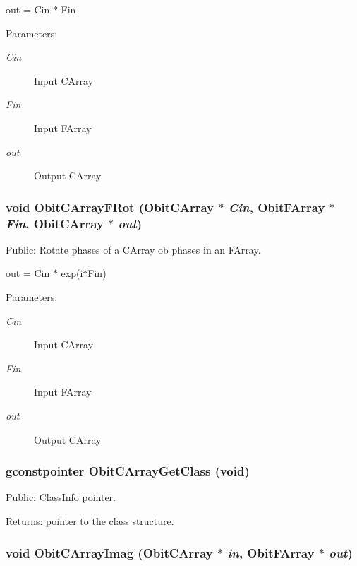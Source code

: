 out = Cin $\ast$ Fin \begin{Desc}
\item[Parameters:]
\begin{description}
\item[{\em Cin}]Input CArray \item[{\em Fin}]Input FArray \item[{\em out}]Output CArray \end{description}
\end{Desc}
\subsubsection{\setlength{\rightskip}{0pt plus 5cm}void Obit\-CArray\-FRot ({\bf Obit\-CArray} $\ast$ {\em Cin}, {\bf Obit\-FArray} $\ast$ {\em Fin}, {\bf Obit\-CArray} $\ast$ {\em out})}\label{ObitCArray_8h_a61}


Public: Rotate phases of a CArray ob phases in an FArray. 

out = Cin $\ast$ exp(i$\ast$Fin) \begin{Desc}
\item[Parameters:]
\begin{description}
\item[{\em Cin}]Input CArray \item[{\em Fin}]Input FArray \item[{\em out}]Output CArray \end{description}
\end{Desc}
\subsubsection{\setlength{\rightskip}{0pt plus 5cm}gconstpointer Obit\-CArray\-Get\-Class (void)}\label{ObitCArray_8h_a38}


Public: Class\-Info pointer. 

\begin{Desc}
\item[Returns:]pointer to the class structure. \end{Desc}
\subsubsection{\setlength{\rightskip}{0pt plus 5cm}void Obit\-CArray\-Imag ({\bf Obit\-CArray} $\ast$ {\em in}, {\bf Obit\-FArray} $\ast$ {\em out})}\label{ObitCArray_8h_a65}


